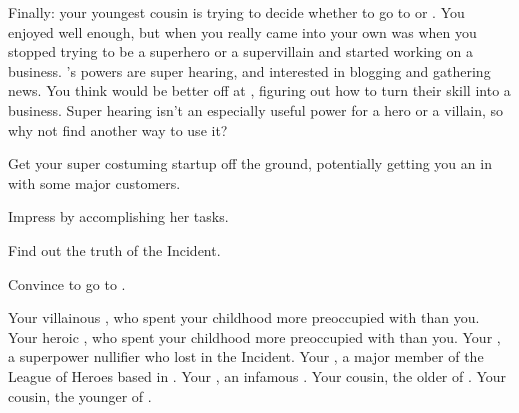 \documentclass[char]{LRSguildcamp1}
\begin{document}
Finally: your youngest cousin \cTween{} is trying to decide whether to go to \pSuperSchool{} or \pNormalSchool{}.  You enjoyed \pSuperSchool{} well enough, but when you really came into your own was when you stopped trying to be a superhero or a supervillain and started working on a business.  \cTween{}'s powers are super hearing, and \cTween{\theyare} interested in blogging and gathering news.  You think \cTween{\they} would be better off at \pNormalSchool{}, figuring out how to turn their skill into a business.  Super hearing isn't an especially useful power for a hero or a villain, so why not find another way to use it?

\begin{itemz}[Goals]
	\item Get your super costuming startup off the ground, potentially getting you an in with some major customers.
	\item Impress \cGrandma{} by accomplishing her tasks.
	\item Find out the truth of the \pCityO{} Incident.
	\item Convince \cTween{} to go to \pNormalSchool{}.
\end{itemz}

\begin{itemz}[Notes]
	\item 
\end{itemz}

\begin{contacts}
	\contact{\cOldest{\intro}} Your villainous \cOldest{\parent}, who spent your childhood more preoccupied with \cOS{} than you.
	\contact{\cOS{\intro}} Your heroic \cOS{\parent}, who spent your childhood more preoccupied with \cOldest{} than you.
	\contact{\cArchitect{\intro}} Your \cArchitect{\uncle}, a superpower nullifier who lost \cArchitect{\their} \cAS{\spouse} in the \pCityO{} Incident.
	\contact{\cYoungest{\intro}} Your \cYoungest{\uncle}, a major member of the League of Heroes based in \pCityYoungest{}.
	\contact{\cGrandma{\intro}} Your \cGrandma{\grandparent}, an infamous \cGrandma{\villain}.
	\contact{\cTeen{\intro}} Your cousin, the older \cTeen{\offspring} of \cArchitect{\Uncle} \cArchitect{}.
	\contact{\cTween{\intro}} Your cousin, the younger \cTween{\offspring} of \cArchitect{\Uncle} \cArchitect{}.
\end{contacts}
\end{document}
